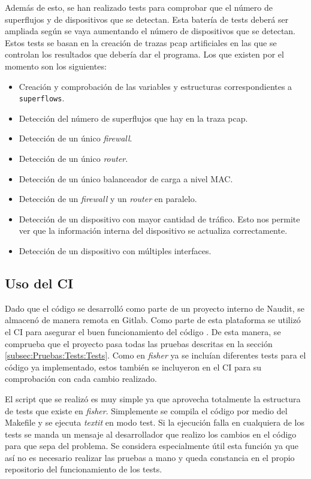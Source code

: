 \documentclass[twoside, 12pt]{epstfg}
\begin{document}
Además de esto, se han realizado tests para comprobar que el número de superflujos y de dispositivos que se detectan. Esta batería de tests deberá ser ampliada según se vaya aumentando el número de dispositivos que se detectan. Estos tests se basan en la creación de trazas pcap artificiales en las que se controlan los resultados que debería dar el programa. Los que existen por el momento son los siguientes:

\begin{itemize}
    \item Creación y comprobación de las variables y estructuras correspondientes a \texttt{superflows}.
    \item Detección del número de superflujos que hay en la traza pcap. 
    \item Detección de un único \textit{firewall}.
    \item Detección de un único \textit{router}.
    \item Detección de un único balanceador de carga a nivel MAC.
    \item Detección de un \textit{firewall} y un \textit{router} en paralelo.
    \item Detección de un dispositivo con mayor cantidad de tráfico. Esto nos permite ver que la información interna del dispositivo se actualiza correctamente.
    \item Detección de un dispositivo con múltiples interfaces.
\end{itemize}

\subsection{Uso del CI}
Dado que el código se desarrolló como parte de un proyecto interno de Naudit, se almacenó de manera remota en Gitlab. Como parte de esta plataforma se utilizó el CI para asegurar el buen funcionamiento del código \cite{GitLabDocs2019}. De esta manera, se comprueba que el proyecto pasa todas las pruebas descritas en la sección \ref{subsec:Pruebas:Tests:Tests}. Como en \textit{fisher} ya se incluían diferentes tests para el código ya implementado, estos también se incluyeron en el CI para su comprobación con cada cambio realizado.

El script que se realizó es muy simple ya que aprovecha totalmente la estructura de tests que existe en \textit{fisher}. Simplemente se compila el código por medio del Makefile y se ejecuta \textit{textit} en modo test. Si la ejecución falla en cualquiera de los tests se manda un mensaje al desarrollador que realizo los cambios en el código para que sepa del problema. Se considera especialmente útil esta función ya que así no es necesario realizar las pruebas a mano y queda constancia en el propio repositorio del funcionamiento de los tests.
\end{document}
